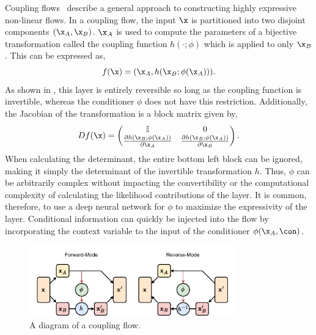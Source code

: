 Coupling flows~\cite{NICENonlinearIndependent} describe a general approach to constructing highly expressive non-linear flows.
In a coupling flow, the input $\x$ is partitioned into two disjoint components $(\x_A, \x_B)$.
$\x_A$ is used to compute the parameters of a bijective transformation called the coupling function $h(\cdot; \phi)$ which is applied to only $\x_B$.
This can be expressed as,
\begin{equation}
    \label{eq:coupling_flow}
    f(\x) = (\x_A, h(\x_B; \phi(\x_A))).
\end{equation}
As shown in , this layer is entirely reversible so long as the coupling function is invertible, whereas the conditioner $\phi$ does not have this restriction.
Additionally, the Jacobian of the transformation is a block matrix given by,
\begin{equation}
    D f(\x) = \begin{pmatrix}
        \mathbb{I}                                         & 0                                                  \\
        \frac{\partial h(\x_B; \phi(\x_A))}{\partial \x_A} & \frac{\partial h(\x_B; \phi(\x_A))}{\partial \x_B}
    \end{pmatrix}.
\end{equation}
When calculating the determinant, the entire bottom left block can be ignored, making it simply the determinant of the invertible transformation $h$.
Thus, $\phi$ can be arbitrarily complex without impacting the convertibility or the computational complexity of calculating the likelihood contributions of the layer.
It is common, therefore, to use a deep neural network for $\phi$ to maximize the expressivity of the layer.
Conditional information can quickly be injected into the flow by incorporating the context variable to the input of the conditioner $\phi(\x_A, \con)$.

\begin{figure}[ht]
    \centering
    \includegraphics[width=0.8\textwidth]{Figures/generative_models/coupling.pdf}
    \caption{A diagram of a coupling flow.}
    \label{fig:coupling_flow}
\end{figure}

